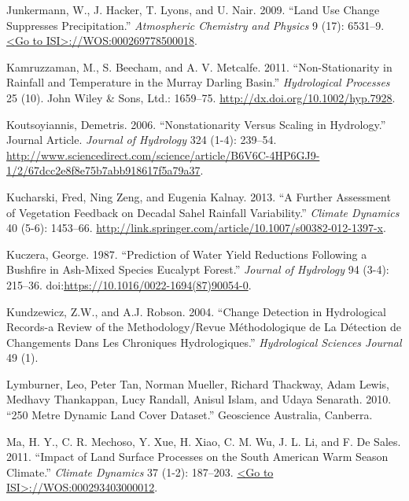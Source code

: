 \documentclass[fleqn,10pt,lineno]{wlpeerj} %
\begin{document}
\hypertarget{ref-Junkermann2009}{}
Junkermann, W., J. Hacker, T. Lyons, and U. Nair. 2009. ``Land Use
Change Suppresses Precipitation.'' \emph{Atmospheric Chemistry and
Physics} 9 (17): 6531--9.
\href{\%3CGo\%20to\%20ISI\%3E://WOS:000269778500018}{\textless{}Go to ISI\textgreater{}://WOS:000269778500018}.

\hypertarget{ref-Kamruzzaman2011}{}
Kamruzzaman, M., S. Beecham, and A. V. Metcalfe. 2011.
``Non-Stationarity in Rainfall and Temperature in the Murray Darling
Basin.'' \emph{Hydrological Processes} 25 (10). John Wiley \& Sons,
Ltd.: 1659--75. \url{http://dx.doi.org/10.1002/hyp.7928}.

\hypertarget{ref-Koutsoyiannis2007}{}
Koutsoyiannis, Demetris. 2006. ``Nonstationarity Versus Scaling in
Hydrology.'' Journal Article. \emph{Journal of Hydrology} 324 (1-4):
239--54.
\href{http://www.sciencedirect.com/science/article/B6V6C-4HP6GJ9-1/2/67dcc2e8f8e75b7abb918617f5a79a37\%20}{http://www.sciencedirect.com/science/article/B6V6C-4HP6GJ9-1/2/67dcc2e8f8e75b7abb918617f5a79a37}.

\hypertarget{ref-kucharski_further_2013}{}
Kucharski, Fred, Ning Zeng, and Eugenia Kalnay. 2013. ``A Further
Assessment of Vegetation Feedback on Decadal Sahel Rainfall
Variability.'' \emph{Climate Dynamics} 40 (5-6): 1453--66.
\url{http://link.springer.com/article/10.1007/s00382-012-1397-x}.

\hypertarget{ref-Kuzcera1987}{}
Kuczera, George. 1987. ``Prediction of Water Yield Reductions Following
a Bushfire in Ash-Mixed Species Eucalypt Forest.'' \emph{Journal of
Hydrology} 94 (3-4): 215--36.
doi:\href{https://doi.org/https://10.1016/0022-1694(87)90054-0}{https://10.1016/0022-1694(87)90054-0}.

\hypertarget{ref-Kundzewicz2004}{}
Kundzewicz, Z.W., and A.J. Robson. 2004. ``Change Detection in
Hydrological Records-a Review of the Methodology/Revue Méthodologique de
La Détection de Changements Dans Les Chroniques Hydrologiques.''
\emph{Hydrological Sciences Journal} 49 (1).

\hypertarget{ref-Lymburner2010}{}
Lymburner, Leo, Peter Tan, Norman Mueller, Richard Thackway, Adam Lewis,
Medhavy Thankappan, Lucy Randall, Anisul Islam, and Udaya Senarath.
2010. ``250 Metre Dynamic Land Cover Dataset.'' Geoscience Australia,
Canberra.

\hypertarget{ref-Ma2011}{}
Ma, H. Y., C. R. Mechoso, Y. Xue, H. Xiao, C. M. Wu, J. L. Li, and F. De
Sales. 2011. ``Impact of Land Surface Processes on the South American
Warm Season Climate.'' \emph{Climate Dynamics} 37 (1-2): 187--203.
\href{\%3CGo\%20to\%20ISI\%3E://WOS:000293403000012}{\textless{}Go to ISI\textgreater{}://WOS:000293403000012}.
\end{document}
